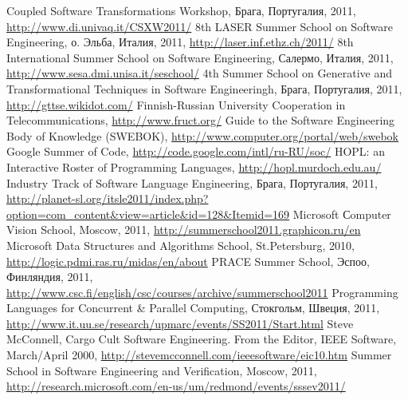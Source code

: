 \documentclass[a5paper]{article}
\begin{document}
\begin{thebibliography}{9001}

   Coupled Software Transformations Workshop, Брага, Португалия, 2011, \url{http://www.di.univaq.it/CSXW2011/}
   8th LASER Summer School on Software Engineering, о. Эльба, Италия, 2011, \url{http://laser.inf.ethz.ch/2011/}
   8th International Summer School on Software Engineering, Салермо, Италия, 2011, \url{http://www.sesa.dmi.unisa.it/seschool/}
   4th Summer School on Generative and Transformational Techniques in Software Engineeringh, Брага, Португалия, 2011,  \url{http://gttse.wikidot.com/}
   Finnish-Russian University Cooperation in Telecommunications, \url{http://www.fruct.org/}
   Guide to the Software Engineering Body of Knowledge (SWEBOK), \url{http://www.computer.org/portal/web/swebok}
   Google Summer of Code, \url{http://code.google.com/intl/ru-RU/soc/}
   HOPL: an Interactive Roster of Programming Languages,  \url{http://hopl.murdoch.edu.au/}
   Industry Track of Software Language Engineering, Брага, Португалия, 2011, \url{http://planet-sl.org/itsle2011/index.php?option=com_content&view=article&id=128&Itemid=169}
   Microsoft Сomputer Vision School, Moscow, 2011, \url{http://summerschool2011.graphicon.ru/en}
   Microsoft Data Structures and Algorithms School, St.Petersburg, 2010, \url{http://logic.pdmi.ras.ru/midas/en/about}
   PRACE Summer School, Эспоо, Финляндия, 2011, \url{http://www.csc.fi/english/csc/courses/archive/summerschool2011}
   Programming Languages for Concurrent \& Parallel Computing, Стокгольм, Швеция, 2011, \url{http://www.it.uu.se/research/upmarc/events/SS2011/Start.html}
   Steve McConnell, Cargo Cult Software Engineering. From the Editor, IEEE Software, March/April 2000, \url{http://stevemcconnell.com/ieeesoftware/eic10.htm}
   Summer School in Software Engineering and Verification, Moscow, 2011, \url{http://research.microsoft.com/en-us/um/redmond/events/sssev2011/}



\end{thebibliography}
\end{document}
